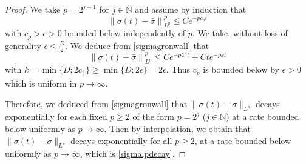 \documentclass[10pt,twoside,reqno]{amsart}
\numberwithin{figure}{section}
\numberwithin{equation}{section}
\theoremstyle{definition}
\newcommand{\1}{\mathbbm{1}}
\newcommand{\diff}{\,\mathrm{d}}
\newcommand{\N}{\mathbb{N}}
\newcommand{\be}{\begin{equation}}
\newcommand{\ee}{\end{equation}}
\newcommand{\la}{\label}
\newcommand{\fr}{\frac}
\begin{document}
\begin{proof}
We take $p = 2^{j + 1}$ for $j \in \N$ and assume by induction that
\be
\left\|\sigma(t) - \bar{\sigma}\right\|_{L^p}^p \le C e^{-pc_p t}
\la{induction}
\ee
with $c_p >\epsilon>0$ bounded below independently of $p$. We take, without loss of generality $\epsilon \le \fr{D}{2}$. We deduce from \eqref{sigmagronwall} that
\be
\left\|\sigma(t) - \bar{\sigma}\right\|_{L^p}^p \le Ce^{-pC't} + C te^{-pkt}
\la{indstep}
\ee
with $k = \min\{ D; 2 c_{\fr{p}{2}}\} \ge \min\{D; 2\epsilon\} = 2\epsilon$. Thus $c_p$ is bounded below by $\epsilon>0$ which is uniform in $p\to\infty$.




Therefore, we deduced from \eqref{sigmagronwall} that $\|\sigma(t) - \bar{\sigma}\|_{L^p}$ decays exponentially for each fixed $p \geq 2$ of the form $p = 2^j$ ($j \in \N$) at a rate bounded below uniformly as $p\to\infty$. Then by interpolation, we obtain that $\|\sigma(t) - \bar{\sigma}\|_{L^p}$ decays exponentially for all $p \geq 2$, at a rate bounded below uniformly as $p\to\infty$, which is \eqref{sigmalpdecay}.
\end{proof}
\end{document}
